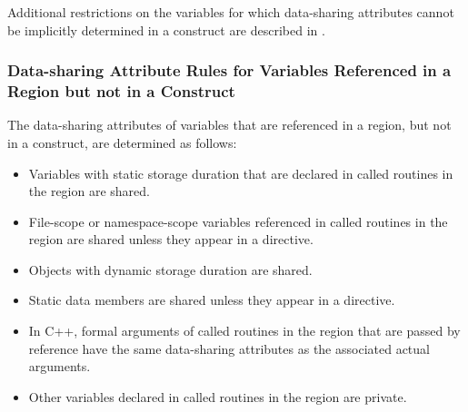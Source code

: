 Additional restrictions on the variables for which data-sharing attributes cannot be 
implicitly determined in a  construct are described in 
.









\subsubsection{Data-sharing Attribute Rules for Variables Referenced in a Region but not in a Construct}
\label{subsubsec:Data-sharing Attribute Rules for Variables Referenced in a Region but not in a Construct}
The data-sharing attributes of variables that are referenced in a region, but not in a 
construct, are determined as follows: 

\ccppspecificstart
\begin{itemize}
\item Variables with static storage duration that are declared in called routines in the region 
are shared.

\item File-scope or namespace-scope variables referenced in called routines in the region 
are shared unless they appear in a  directive.

\item Objects with dynamic storage duration are shared.

\item Static data members are shared unless they appear in a  directive.

\item In C++, formal arguments of called routines in the region that are passed by reference have the same data-sharing attributes as the associated actual arguments. 

\item Other variables declared in called routines in the region are private.
\end{itemize}
\ccppspecificend

